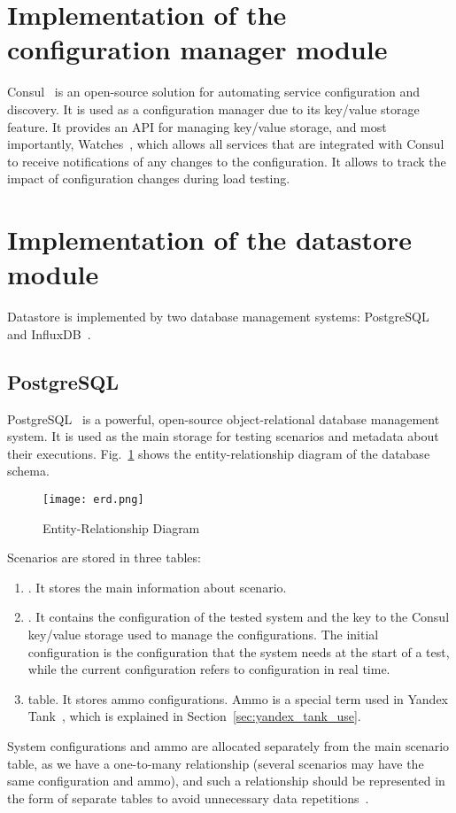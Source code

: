 \section{Implementation of the configuration manager module}
Consul~\cite{consul} is an open-source solution for automating service configuration and discovery. It is used as a configuration manager due to its key/value storage feature. It provides an API for managing key/value storage, and most importantly, Watches~\cite{consul_watches}, which allows all services that are integrated with Consul to receive notifications of any changes to the configuration. It allows to track the impact of configuration changes during load testing.


\section{Implementation of the datastore module}\label{sec:implementation-of-datastore}
Datastore is implemented by two database management systems: PostgreSQL~\cite{postgresql} and InfluxDB~\cite{influxdb}.

\subsection{PostgreSQL}\label{subsec:postgresql}
PostgreSQL~\cite{postgresql} is a powerful, open-source object-relational database management system. It is used as the main storage for testing scenarios and metadata about their executions. Fig.~\ref{fig:erd} shows the entity-relationship diagram of the database schema.
\begin{figure}[t]
    \centering
    \texttt{[image: erd.png]}
    \caption{Entity-Relationship Diagram}
    \label{fig:erd}
\end{figure}

Scenarios are stored in three tables:
\begin{enumerate}
    \item {}. It stores the main information about scenario.
    \item {}. It contains the configuration of the tested system and the key to the Consul key/value storage used to manage the configurations. The initial configuration is the configuration that the system needs at the start of a test, while the current configuration refers to configuration in real time.
    \item {} table. It stores ammo configurations. Ammo is a special term used in Yandex Tank~\cite{yandex_tank}, which is explained in Section~\ref{sec:yandex_tank_use}.
\end{enumerate}
System configurations and ammo are allocated separately from the main scenario table, as we have a one-to-many relationship (several scenarios may have the same configuration and ammo), and such a relationship should be represented in the form of separate tables to avoid unnecessary data repetitions~\cite{normal_forms}.


